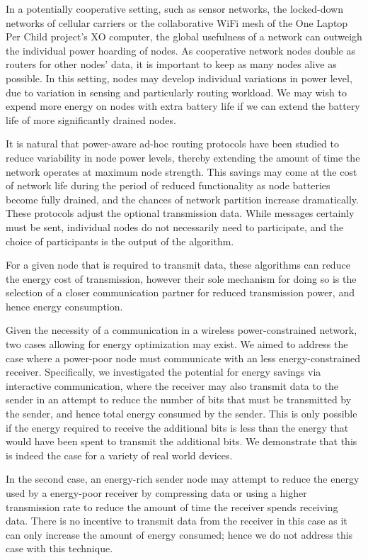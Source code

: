 \documentclass[conference]{IEEEtran}
\begin{document}
In a potentially cooperative setting, such as sensor networks, the
locked-down networks of cellular carriers or the collaborative WiFi
mesh of the One Laptop Per Child project's XO computer, the global
usefulness of a network can outweigh the individual power hoarding of
nodes.  As cooperative network nodes double as routers for other
nodes' data, it is important to keep as many nodes alive as possible.
In this setting, nodes may develop individual variations in power
level, due to variation in sensing and particularly routing workload.
We may wish to expend more energy on nodes with extra battery life if we
can extend the battery life of more significantly drained nodes.

It is natural that power-aware ad-hoc routing protocols have been
studied to reduce variability in node power levels, thereby extending
the amount of time the network operates at maximum node strength.
This savings may come at the cost of network life during the period of
reduced functionality as node batteries become fully drained, and the
chances of network partition increase dramatically.  These protocols
adjust the optional transmission data.  While messages certainly must
be sent, individual nodes do not necessarily need to participate, and
the choice of participants is the output of the algorithm.

For a given node that is required to transmit data, these algorithms
can reduce the energy cost of transmission, however their sole
mechanism for doing so is the selection of a closer communication
partner for reduced transmission power, and hence energy
consumption.

Given the necessity of a communication in a wireless power-constrained
network, two cases allowing for energy optimization may exist.  We
aimed to address the case where a power-poor node must communicate
with an less energy-constrained receiver.  Specifically, we
investigated the potential for energy savings via interactive
communication, where the receiver may also transmit data to the sender
in an attempt to reduce the number of bits that must be transmitted by
the sender, and hence total energy consumed by the sender.  This is
only possible if the energy required to receive the additional bits is
less than the energy that would have been spent to transmit the
additional bits.  We demonstrate that this is indeed the case for a
variety of real world devices.

In the second case, an energy-rich sender node may attempt to reduce the
energy used by a energy-poor receiver by compressing data or using a
higher transmission rate to reduce the amount of time the receiver
spends receiving data.  There is no incentive to transmit data from
the receiver in this case as it can only increase the amount of energy
consumed; hence we do not address this case with this technique.
\end{document}

